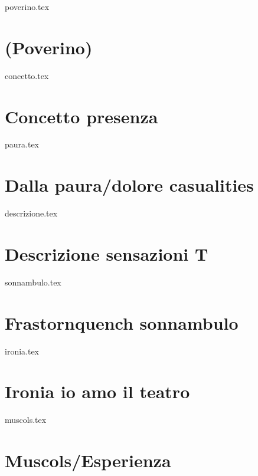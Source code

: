 \begin{filecontents}{poverino.tex}
\section{(Poverino)}

\end{filecontents}

\begin{filecontents}{concetto.tex}
\section{Concetto presenza}

\end{filecontents}

\begin{filecontents}{paura.tex}
\section{Dalla paura/dolore casualities}

\end{filecontents}

\begin{filecontents}{descrizione.tex}

\section{Descrizione sensazioni T}

\end{filecontents}

\begin{filecontents}{sonnambulo.tex}
\section{Frastornquench sonnambulo}

\end{filecontents}

\begin{filecontents}{ironia.tex}

\section{Ironia io amo il teatro}

\end{filecontents}

\begin{filecontents}{muscols.tex}

\section{Muscols/Esperienza}

\end{filecontents}

